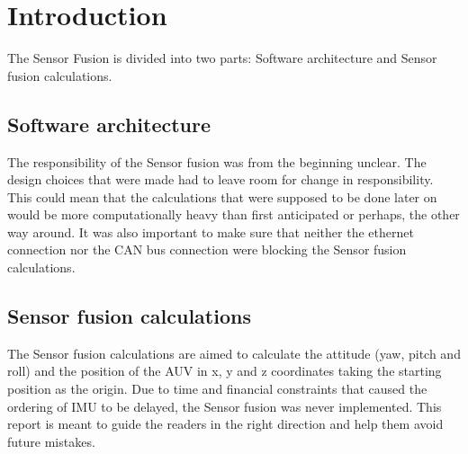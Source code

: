 
\section{Introduction}\label{sec:introduction}
The Sensor Fusion is divided into two parts: Software architecture and Sensor fusion calculations.

\subsection{Software architecture}
The responsibility of the Sensor fusion was from the beginning unclear. The design
choices that were made had to leave room for change in responsibility.
This could mean that the calculations that were supposed to be done later on would be 
more computationally heavy than first anticipated or perhaps, the other way around.
It was also important to make sure that neither the ethernet connection nor the CAN bus
connection were blocking the Sensor fusion calculations.

\subsection{Sensor fusion calculations}
The Sensor fusion calculations are aimed to calculate the attitude
(yaw, pitch and roll) and the position of the AUV in x, y and z
coordinates taking the starting position as the origin. Due to time and financial 
constraints that caused the ordering of IMU to be delayed, the Sensor fusion was never implemented. 
This report
is meant to guide the readers in the right direction and help them avoid
future mistakes.
